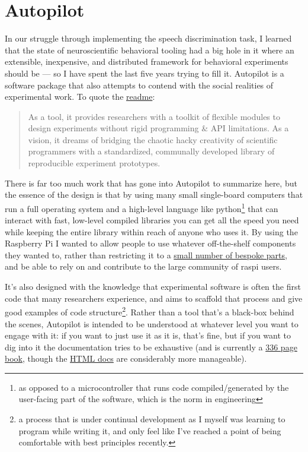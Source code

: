 \section{Autopilot}
\label{sec:autopilot}

In our struggle through implementing the speech discrimination task, I learned that the state of neuroscientific behavioral tooling had a big hole in it where an extensible, inexpensive, and distributed framework for behavioral experiments should be --- so I have spent the last five years trying to fill it\cite{saundersAutopilotAutomatingBehavioral2019}. Autopilot is a software package that also attempts to contend with the social realities of experimental work. To quote the \href{https://github.com/wehr-lab/autopilot/blob/main/README.md}{readme}:

\begin{quote}
As a tool, it provides researchers with a toolkit of flexible modules to design experiments without rigid programming \& API limitations. As a vision, it dreams of bridging the chaotic hacky creativity of scientific programmers with a standardized, communally developed library of reproducible experiment prototypes.
\end{quote}


There is far too much work that has gone into Autopilot to summarize here, but the essence of the design is that by using many small single-board computers that run a full operating system and a high-level language like python\footnote{as opposed to a microcontroller that runs code compiled/generated by the user-facing part of the software, which is the norm in engineering} that can interact with fast, low-level compiled libraries you can get all the speed you need while keeping the entire library within reach of anyone who uses it. By using the Raspberry Pi I wanted to allow people to use whatever off-the-shelf components they wanted to, rather than restricting it to a \href{https://sanworks.io/shop/products.php?productFamily=bpod}{small number of bespoke parts}, and be able to rely on and contribute to the large community of raspi users.

It's also designed with the knowledge that experimental software is often the first code that many researchers experience, and aims to scaffold that process and give good examples of code structure\footnote{a process that is under continual development as I myself was learning to program while writing it, and only feel like I've reached a point of being comfortable with best principles recently.}. Rather than a tool that's a black-box behind the scenes, Autopilot is intended to be understood at whatever level you want to engage with it: if you want to just use it as it is, that's fine, but if you want to dig into it the documentation tries to be exhaustive (and is currently a \href{https://docs.auto-pi-lot.com/_/downloads/en/latest/pdf/}{336 page book}, though the \href{https://docs.auto-pi-lot.com/en/latest/}{HTML docs} are considerably more manageable).

